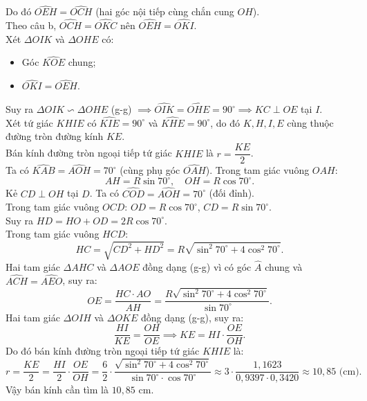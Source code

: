 \begin{bt}
{\begin{enumerate}[a)]
	Do đó $\widehat{OEH} = \widehat{OCH}$ (hai góc nội tiếp cùng chắn cung $OH$).\\
	Theo câu b, $\widehat{OCH} = \widehat{OKC}$ nên $\widehat{OEH} = \widehat{OKI}$.\\
	Xét $\Delta OIK$ và $\Delta OHE$ có:
	\begin{itemize}
		\item Góc $\widehat{KOE}$ chung;
		\item $\widehat{OKI} = \widehat{OEH}$.
	\end{itemize}
	Suy ra $\Delta OIK \backsim \Delta OHE$ (g-g) $\implies \widehat{OIK} = \widehat{OHE} = 90^\circ \implies KC \perp OE$ tại $I$.\\
	Xét tứ giác $KHIE$ có $\widehat{KIE} = 90^\circ$ và $\widehat{KHE} = 90^\circ$, do đó $K, H, I, E$ cùng thuộc đường tròn đường kính $KE$.\\
	Bán kính đường tròn ngoại tiếp tứ giác $KHIE$ là $r = \dfrac{KE}{2}$.\\
	Ta có $\widehat{KAB} = \widehat{AOH} = 70^\circ$ (cùng phụ góc $\widehat{OAH}$). Trong tam giác vuông $OAH$:
	$$AH = R \sin 70^\circ, \quad OH = R \cos 70^\circ.$$
	Kẻ $CD \perp OH$ tại $D$. Ta có $\widehat{COD} = \widehat{AOH} = 70^\circ$ (đối đỉnh).\\
	Trong tam giác vuông $OCD$: $OD = R \cos 70^\circ$, $CD = R \sin 70^\circ$.\\
	Suy ra $HD = HO + OD = 2R \cos 70^\circ$.\\
	Trong tam giác vuông $HCD$:
	$$HC = \sqrt{CD^2 + HD^2} = R\sqrt{\sin^2 70^\circ + 4\cos^2 70^\circ}.$$
	Hai tam giác $\Delta AHC$ và $\Delta AOE$ đồng dạng (g-g) vì có góc $\widehat{A}$ chung và $\widehat{ACH} = \widehat{AEO}$, suy ra:
	$$OE = \dfrac{HC \cdot AO}{AH} = \dfrac{R\sqrt{\sin^2 70^\circ + 4\cos^2 70^\circ}}{\sin 70^\circ}.$$
	Hai tam giác $\Delta OIH$ và $\Delta OKE$ đồng dạng (g-g), suy ra:
	$$\dfrac{HI}{KE} = \dfrac{OH}{OE} \implies KE = HI \cdot \dfrac{OE}{OH}.$$
	Do đó bán kính đường tròn ngoại tiếp tứ giác $KHIE$ là:
	$$r = \dfrac{KE}{2} = \dfrac{HI}{2} \cdot \dfrac{OE}{OH} = \dfrac{6}{2} \cdot \dfrac{\sqrt{\sin^2 70^\circ + 4\cos^2 70^\circ}}{\sin 70^\circ \cdot \cos 70^\circ} \approx 3 \cdot \dfrac{1{,}1623}{0{,}9397 \cdot 0{,}3420} \approx 10{,}85\text{ (cm)}.$$
	Vậy bán kính cần tìm là $10{,}85\text{ cm}$.
\end{enumerate}
}
\end{bt}
